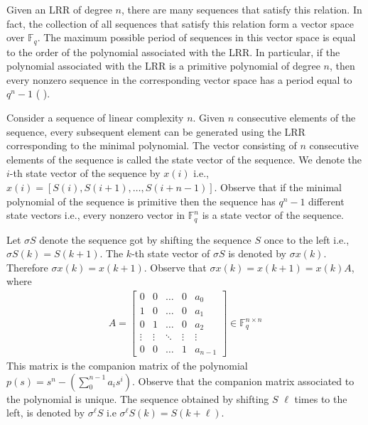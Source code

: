 \documentclass[letterpaper, 12 pt]{article}  \usepackage{amssymb}
\newcommand{\F}{\mathbb{F}}
\begin{document}
Given an LRR of degree $n$, there are many sequences that satisfy this relation.
In fact, the collection of all sequences that satisfy this relation form a
vector space over $\F_q$. The maximum possible period of sequences in this
vector space is equal to the order of the polynomial associated with the LRR. In
particular, if the polynomial associated with 
the LRR is a primitive polynomial of degree $n$, then every nonzero sequence in
the corresponding vector space has a period equal to $q^n - 1$ ( \cite[Theorem
6.33]{lidl}).

Consider a sequence of linear complexity $n$. Given $n$ consecutive elements of
the sequence, every subsequent element can be generated using the LRR
corresponding to the minimal polynomial. The vector consisting of $n$
consecutive elements of the sequence is called the state vector of the sequence.
We denote the $i$-th state vector of the sequence by $x(i)$ i.e., $x(i) =
[S(i),S(i+1),\ldots,S(i+n-1)]$. Observe that if the minimal polynomial of the
sequence is primitive then the sequence has $q^n-1$ different state
vectors i.e., every nonzero vector in $\F_q^n$ is a state vector of the
sequence. 

Let $\sigma S$ denote the sequence got by shifting the sequence $S$ once
to the left i.e., $\sigma S(k) = S(k+1)$. The $k$-th state vector of
$\sigma S$ is denoted by $\sigma x(k)$. Therefore $\sigma x(k) = x(k+1)$.
Observe that  $\sigma x(k) = x(k+1) = x(k)A $, where
\begin{eqnarray*}
\label{A}
  A = \left[
 \begin{matrix}
 0 & 0 & \ldots & 0 & a_0\\
 1 & 0 & \ldots & 0 & a_1\\
 0 & 1 & \ldots & 0 & a_2\\
 \vdots & \vdots & \ddots & \vdots & \vdots\\
 0 & 0 & \ldots & 1 & a_{n-1} 
 \end{matrix}
 \right]
   \in \F_q^{n \times n}
\end{eqnarray*}
This matrix is the companion matrix of the polynomial $p(s)= s^n -(\sum_0^{n-1}
a_is^i)$.  Observe that the 
companion matrix associated to the polynomial is unique. The sequence obtained by
shifting $S$ 
$\ell$ times to the left, is denoted by $\sigma^\ell S$ i.e $\sigma^\ell
S(k) = S(k+\ell)$.
\end{document}
